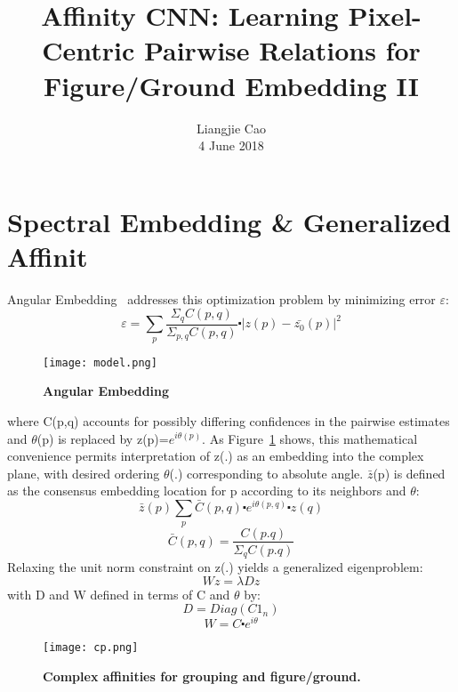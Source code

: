 \documentclass[10pt,twocolumn,letterpaper]{article}
\begin{document}
\title{\textbf{Affinity CNN: Learning Pixel-Centric Pairwise Relations for Figure/Ground Embedding II}}
\author{Liangjie Cao\\4 June 2018}
\maketitle
\section{Spectral Embedding \& Generalized Affinit}
 Angular Embedding~\cite{name38} addresses this optimization problem by minimizing error $\varepsilon$:
 \begin{equation}
  \varepsilon{=}\sum_{p}\frac{\Sigma_{q}C(p,q)}{\Sigma_{p,q}C(p,q)} \centerdot{\lvert{z(p)}{-}{\bar{z_0}}(p)\rvert}^2
 \end{equation}
 \begin{figure}[!htb]
 \centering
 \texttt{[image: model.png]}\\
 \caption{\textbf{Angular Embedding~\cite{name38}}}\label{Figure1}
 \end{figure}
where C(p,q) accounts for possibly differing confidences in the pairwise estimates and $\theta$(p) is replaced by z(p)=$e^{i\theta(p)}$. As Figure~\ref{Figure1} shows, this mathematical convenience permits interpretation of z(.) as an embedding into the complex plane, with desired ordering $\theta$(.) corresponding to absolute angle. $\bar{z}$(p) is defined as the consensus embedding location for p according to its neighbors and $\theta$:
\begin{equation}
 \bar{z}(p)\sum_{p}\bar{C}(p,q)\centerdot e^{i\theta(p,q)} \centerdot z(q)
\end{equation}
\begin{equation}
 \bar{C}(p,q)=\frac{C(p.q)}{\Sigma_{q}C(p.q)}
\end{equation}
Relaxing the unit norm constraint on z(.) yields a generalized eigenproblem:
\begin{equation}
Wz=\lambda{Dz}
\end{equation}
with D and W defined in terms of C and $\theta$ by:
\begin{equation}
 D=Diag(C1_n)
\end{equation}
\begin{equation}
 W=C \centerdot e^{i\theta}
\end{equation}
\begin{figure}[!htb]
 \centering
 \texttt{[image: cp.png]}\\
 \caption{ \textbf{Complex affinities for grouping and figure/ground.}}\label{Figure2}
 \end{figure}
\end{document}
